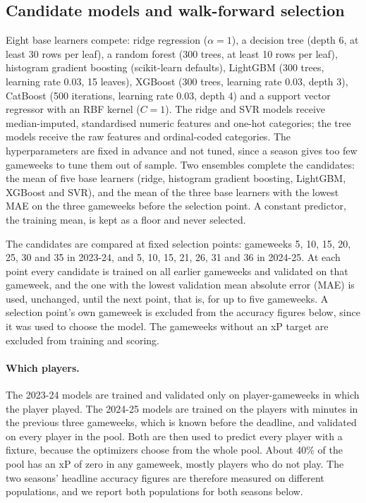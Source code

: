 \subsection{Candidate models and walk-forward selection}
\label{sec:predictions-selection}

Eight base learners compete: ridge regression ($\alpha=1$), a decision tree (depth 6, at least
30 rows per leaf), a random forest (300 trees, at least 10 rows per leaf), histogram gradient
boosting (scikit-learn defaults), LightGBM (300 trees, learning rate 0.03, 15 leaves), XGBoost
(300 trees, learning rate 0.03, depth 3), CatBoost (500 iterations, learning rate 0.03, depth 4)
and a support vector regressor with an RBF kernel ($C=1$). The ridge and SVR models receive
median-imputed, standardised numeric features and one-hot categories; the tree models receive
the raw features and ordinal-coded categories. The hyperparameters are fixed in advance and
not tuned, since a season gives too few gameweeks to tune them out of sample. Two ensembles
complete the candidates: the mean of five base learners (ridge, histogram gradient boosting,
LightGBM, XGBoost and SVR), and the mean of the three base learners with the lowest MAE on the
three gameweeks before the selection point. A constant predictor, the training mean, is kept as
a floor and never selected.

The candidates are compared at fixed selection points: gameweeks 5, 10, 15, 20, 25, 30 and 35
in 2023-24, and 5, 10, 15, 21, 26, 31 and 36 in 2024-25. At each point every candidate is
trained on all earlier gameweeks and validated on that gameweek, and the one with the lowest
validation mean absolute error (MAE) is used, unchanged, until the next point, that is, for up
to five gameweeks. A selection point's own gameweek is excluded from the accuracy figures below,
since it was used to choose the model. The gameweeks without an xP target are excluded from
training and scoring.

\paragraph{Which players.} The 2023-24 models are trained and validated only on player-gameweeks
in which the player played. The 2024-25 models are trained on the players with minutes in the
previous three gameweeks, which is known before the deadline, and validated on every player in
the pool. Both are then used to predict every player with a fixture, because the optimizers
choose from the whole pool. About 40\% of the pool has an xP of zero in any gameweek, mostly
players who do not play. The two seasons' headline accuracy figures are therefore measured on
different populations, and we report both populations for both seasons below.

